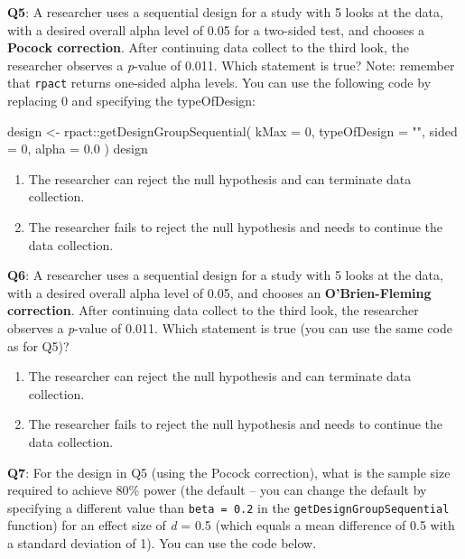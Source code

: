\documentclass[
  oneside]{krantz}
\makeatletter
\newenvironment{Shaded}{\begin{snugshade}}{\end{snugshade}}
\newcommand{\AttributeTok}[1]{\textcolor[rgb]{0.61,0.61,0.61}{#1}}
\newcommand{\DecValTok}[1]{\textcolor[rgb]{0.06,0.06,0.06}{#1}}
\newcommand{\FloatTok}[1]{\textcolor[rgb]{0.06,0.06,0.06}{#1}}
\newcommand{\FunctionTok}[1]{\textcolor[rgb]{0,0,0}{#1}}
\newcommand{\NormalTok}[1]{#1}
\newcommand{\OtherTok}[1]{\textcolor[rgb]{0.37,0.37,0.37}{#1}}
\newcommand{\SpecialCharTok}[1]{\textcolor[rgb]{0,0,0}{#1}}
\newcommand{\StringTok}[1]{\textcolor[rgb]{0.5,0.5,0.5}{#1}}
\providecommand{\tightlist}{%
  \setlength{\itemsep}{0pt}\setlength{\parskip}{0pt}}
\newenvironment{kframe}{%
\medskip{}
\setlength{\fboxsep}{.8em}
 \def\at@end@of@kframe{}%
 \ifinner\ifhmode%
  \def\at@end@of@kframe{\end{minipage}}%
  \begin{minipage}{\columnwidth}%
 \fi\fi%
 \def\FrameCommand##1{\hskip\@totalleftmargin \hskip-\fboxsep
 \colorbox{shadecolor}{##1}\hskip-\fboxsep
     \hskip-\linewidth \hskip-\@totalleftmargin \hskip\columnwidth}%
 \MakeFramed {\advance\hsize-\width
   \@totalleftmargin\z@ \linewidth\hsize
   \@setminipage}}%
 {\par\unskip\endMakeFramed%
 \at@end@of@kframe}
\renewenvironment{Shaded}{\begin{kframe}}{\end{kframe}}
\makeatother
\begin{document}
\textbf{Q5}: A researcher uses a sequential design for a study with 5 looks at the data, with a desired overall alpha level of 0.05 for a two-sided test, and chooses a \textbf{Pocock correction}. After continuing data collect to the third look, the researcher observes a \emph{p}-value of 0.011. Which statement is true? Note: remember that \texttt{rpact} returns one-sided alpha levels. You can use the following code by replacing 0 and specifying the typeOfDesign:

\begin{Shaded}
\begin{Highlighting}[]
\NormalTok{design }\OtherTok{\textless{}{-}}\NormalTok{ rpact}\SpecialCharTok{::}\FunctionTok{getDesignGroupSequential}\NormalTok{(}
  \AttributeTok{kMax =} \DecValTok{0}\NormalTok{,}
  \AttributeTok{typeOfDesign =} \StringTok{""}\NormalTok{,}
  \AttributeTok{sided =} \DecValTok{0}\NormalTok{,}
  \AttributeTok{alpha =} \FloatTok{0.0}
\NormalTok{)}
\NormalTok{design}
\end{Highlighting}
\end{Shaded}

\begin{enumerate}
\def\labelenumi{\Alph{enumi})}
\tightlist
\item
  The researcher can reject the null hypothesis and can terminate data collection.
\item
  The researcher fails to reject the null hypothesis and needs to continue the data collection.
\end{enumerate}

\textbf{Q6}: A researcher uses a sequential design for a study with 5 looks at the data, with a desired overall alpha level of 0.05, and chooses an \textbf{O'Brien-Fleming correction}. After continuing data collect to the third look, the researcher observes a \emph{p}-value of 0.011. Which statement is true (you can use the same code as for Q5)?

\begin{enumerate}
\def\labelenumi{\Alph{enumi})}
\tightlist
\item
  The researcher can reject the null hypothesis and can terminate data collection.
\item
  The researcher fails to reject the null hypothesis and needs to continue the data collection.
\end{enumerate}

\textbf{Q7}: For the design in Q5 (using the Pocock correction), what is the sample size required to achieve 80\% power (the default -- you can change the default by specifying a different value than \texttt{beta\ =\ 0.2} in the \texttt{getDesignGroupSequential} function) for an effect size of \emph{d} = 0.5 (which equals a mean difference of 0.5 with a standard deviation of 1). You can use the code below.
\end{document}
